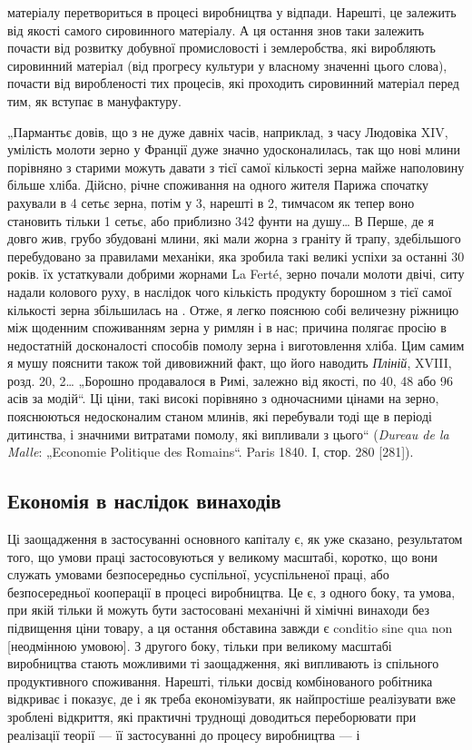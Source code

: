 \parcont{}  %
матеріалу перетвориться в процесі виробництва у відпади. Нарешті, це залежить від якості самого
сировинного матеріалу. А ця остання знов таки залежить почасти від розвитку добувної промисловості і
землеробства, які виробляють сировинний матеріал (від прогресу культури у власному значенні цього
слова), почасти від виробленості тих процесів, які проходить
сировинний матеріал перед тим, як вступає в мануфактуру.

„Пармантьє довів, що з не дуже давніх часів, наприклад, з часу Людовіка XIV, умілість молоти зерно у
Франції дуже
значно удосконалилась, так що нові млини порівняно з старими
можуть давати з тієї самої кількості зерна майже наполовину
більше хліба. Дійсно, річне споживання на одного жителя Парижа
спочатку рахували в 4 сетьє зерна, потім у 3, нарешті в 2, тимчасом як тепер воно становить тільки
1 сетьє, або приблизно
342 фунти на душу\dots{} В Перше, де я довго жив, грубо збудовані млини, які мали жорна з граніту й
трапу, здебільшого перебудовано за правилами механіки, яка зробила такі великі успіхи за останні 30
років. їх устаткували добрими жорнами La Ferté,
зерно почали молоти двічі, ситу надали колового руху, в наслідок чого кількість продукту борошном з
тієї самої кількості
зерна збільшилась на . Отже, я легко пояснюю собі величезну
ріжницю між щоденним споживанням зерна у римлян і в нас;
причина полягає просію в недостатній досконалості способів
помолу зерна і виготовлення хліба. Цим самим я мушу пояснити
також той дивовижний факт, що його наводить \emph{Пліній}, XVIII,
розд. 20, 2\dots{} „Борошно продавалося в Римі, залежно від якості,
по 40, 48 або 96 асів за модій“. Ці ціни, такі високі порівняно
з одночасними цінами на зерно, пояснюються недосконалим станом млинів, які перебували тоді ще в
періоді дитинства, і значними витратами помолу, які випливали з цього“ (\emph{Dureau de la Malle}:
„Economie Politique des Romains“. Paris 1840. І, стор.
280 [281]).

\subsection{Економія в наслідок винаходів}

Ці заощадження в застосуванні основного капіталу є, як уже
сказано, результатом того, що умови праці застосовуються
у великому масштабі, коротко, що вони служать умовами безпосередньо суспільної, усуспільненої праці,
або безпосередньої
кооперації в процесі виробництва. Це є, з одного боку, та умова,
при якій тільки й можуть бути застосовані механічні й хімічні
винаходи без підвищення ціни товару, а ця остання обставина
завжди є conditio sine qua non [неодмінною умовою]. З другого
боку, тільки при великому масштабі виробництва стають можливими ті заощадження, які випливають із
спільного продуктивного
споживання. Нарешті, тільки досвід комбінованого робітника відкриває і показує, де і як треба
економізувати, як найпростіше
реалізувати вже зроблені відкриття, які практичні труднощі доводиться
переборювати при реалізації теорії — її застосуванні до
процесу виробництва — і~

